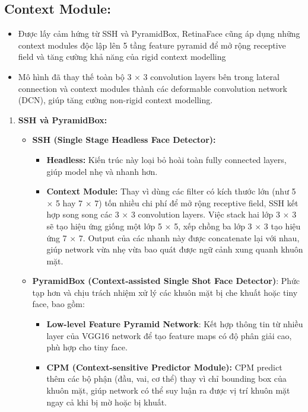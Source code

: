 \documentclass[12pt, a4paper, oneside]{book}
\theoremstyle{plain}
\numberwithin{equation}{chapter} \DeclareMathOperator{\Var}{var}
\begin{document}
\subsection{Context Module:} \label{eq:context_modules}
\begin{itemize}
    \item[--] Được lấy cảm hứng từ SSH và PyramidBox, RetinaFace cũng áp dụng những context modules độc lập lên 5 tầng feature pyramid để mở rộng receptive field và tăng cường khả năng của rigid context modelling
    \item[--] Mô hình đã thay thế toàn bộ 3 \(\times\) 3 convolution layers bên trong lateral connection và context modules thành các deformable convolution network (DCN), giúp tăng cường non-rigid context modelling.
\end{itemize}
\begin{enumerate}
    \item \textbf{SSH và PyramidBox:}
    \begin{itemize}
        \item[+] \textbf{SSH (Single Stage Headless Face Detector):} 
        \begin{itemize}
            \item \textbf{Headless:} Kiến trúc này loại bỏ hoài toàn fully connected layers, giúp model nhẹ và nhanh hơn.
            \item \textbf{Context Module:} Thay vì dùng các filter có kích thước lớn (như 5 \(\times\) 5 hay 7 \(\times\) 7) tốn nhiều chi phí để mở rộng receptive field, SSH kết hợp song song các 3 \(\times\) 3 convolution layers. Việc stack hai lớp 3 \(\times\) 3 sẽ tạo hiệu ứng giống một lớp 5 \(\times\) 5, xếp chồng ba lớp 3 \(\times\) 3 tạo hiệu ứng 7 \(\times\) 7. Output của các nhanh này được concatenate lại với nhau, giúp network vừa nhẹ vừa bao quát được ngữ cảnh xung quanh khuôn mặt.
        \end{itemize}  
        \item[+] \textbf{PyramidBox (Context-assisted Single Shot Face Detector)}: Phức tạp hơn và chịu trách nhiệm xử lý các khuôn mặt bị che khuất hoặc tiny face, bao gồm:
        \begin{itemize}
            \item \textbf{Low-level Feature Pyramid Network}: Kết hợp thông tin từ nhiều layer của VGG16 network để tạo feature maps có độ phân giải cao, phù hợp cho tiny face.
            \item \textbf{CPM (Context-sensitive Predictor Module):} CPM predict thêm các bộ phận (đầu, vai, cơ thể) thay vì chỉ bounding box của khuôn mặt, giúp network có thể suy luận ra được vị trí khuôn mặt ngay cả khi bị mờ hoặc bị khuất.

\end{itemize}
\end{itemize}
\end{enumerate}
\end{document}
